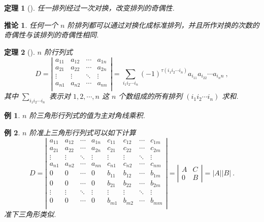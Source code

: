 \documentclass[zihao=-4,UTF8,linespread=1.8,nothm]{aytony_base}
\newtheorem{theorem}{\indent 定理}[subsection]
\newtheorem*{corollary}{\indent 推论}
\newtheorem{example}{\indent 例}[subsection]
\begin{document}
\begin{theorem}[]
    任一排列经过一次对换，改变排列的奇偶性.
\end{theorem}

\begin{corollary}
    任何一个 $n$ 阶排列都可以通过对换化成标准排列，并且所作对换的次数的奇偶性与该排列的奇偶性相同.
\end{corollary}

\begin{theorem}[]
    $n$ 阶行列式 $$
        D = \left|
        \begin{matrix}
            a_{11} & a_{12} & \cdots & a_{1n} \\
            a_{21} & a_{22} & \cdots & a_{2n} \\
            \vdots & \vdots & \ddots & \vdots \\
            a_{n1} & a_{n2} & \cdots & a_{nn} \\
        \end{matrix}
        \right| = \sum_{i_1i_2\cdots i_n}
        (-1)^{\tau(i_1i_2\cdots i_n)}a_{i_11}a_{i_22}\cdots a_{i_nn}\ ,
    $$ 其中 $\sum\limits_{i_1i_2\cdots i_n}^{}$ 表示对 $1, 2, \cdots, n$ 这 $n$ 个数组成的所有排列 $(i_1i_2\cdots i_n)$ 求和.
\end{theorem}

\setcounter{example}{1}
\begin{example}
    $n$ 阶三角形行列式的值为主对角线乘积.
\end{example}

\setcounter{example}{3}
\begin{example}
    $n$ 阶准上三角形行列式可以如下计算 $$
        D = \left|
        \begin{matrix}
            a_{11} & a_{12} & \cdots & a_{1n} & c_{11} & c_{12} & \cdots & c_{1m} \\
            a_{21} & a_{22} & \cdots & a_{2n} & c_{21} & c_{22} & \cdots & c_{2m} \\
            \vdots & \vdots & \ddots & \vdots & \vdots & \vdots & \ddots & \vdots \\
            a_{n1} & a_{n2} & \cdots & a_{nn} & c_{n1} & c_{n2} & \cdots & c_{nm} \\
            0      & 0      & \cdots & 0      & b_{11} & b_{12} & \cdots & b_{1m} \\
            0      & 0      & \cdots & 0      & b_{21} & b_{22} & \cdots & b_{2m} \\
            \vdots & \vdots & \ddots & \vdots & \vdots & \vdots & \ddots & \vdots \\
            0      & 0      & \cdots & 0      & b_{m1} & b_{m2} & \cdots & b_{mm} \\
        \end{matrix}
        \right| = \left|
        \begin{matrix}
            A & C \\
            0 & B
        \end{matrix}
        \right| = |A||B|\ .
    $$ 准下三角形类似.
\end{example}
\end{document}

